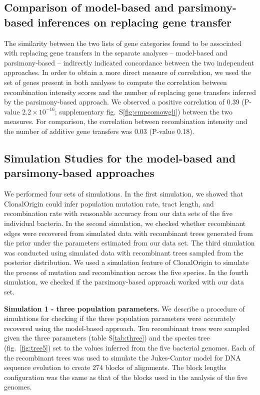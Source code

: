 \documentclass[12pt]{article}
\begin{document}
\subsection*{Comparison of model-based and parsimony-based inferences on
replacing gene transfer}

The similarity between the two lists of gene categories found to be associated
with replacing gene transfers in the separate analyses -- model-based and
parsimony-based --  indirectly indicated concordance between the two independent
approaches.  In order to obtain a more direct measure of correlation, we used
the set of genes present in both analyses to compute the correlation between
recombination intensity scores and the number of replacing gene transfers
inferred by the parsimony-based approach. We observed a positive correlation of
$0.39$ (P-value $2.2\times10^{-16}$; supplementary fig.\ S\ref{fig:cmpcomowgli})
between the
two measures.  For comparison, the correlation between recombination intensity
and the number of additive gene transfers was 0.03 (P-value 0.18).

\subsection*{Simulation Studies for the model-based and parsimony-based approaches}
We performed four sets of simulations.  In the first simulation, we 
showed that ClonalOrigin could infer population mutation rate, tract
length, and recombination rate with reasonable accuracy from our data sets of
the five individual bacteria. In the second
simulation, we checked whether recombinant edges were recovered from
simulated data with recombinant trees generated from the prior under the
parameters estimated from our data set. The third
simulation was conducted using simulated data with recombinant trees sampled
from the
posterior distribution.  We used a simulation feature of ClonalOrigin
to simulate the process of mutation and recombination across the five species.
In the fourth simulation, we checked if the parsimony-based approach worked with
our data set.

\textbf{Simulation 1 - three population parameters.}
We describe a procedure of simulations for checking if the three
population parameters were accurately recovered using the model-based approach.
Ten recombinant trees were sampled given the three parameters (table
S\ref{tab:three}) and the species tree (fig.\ \ref{fig:tree5}) set to the
values inferred from the five bacterial genomes.  Each of the recombinant trees
was used to simulate the Jukes-Cantor model for DNA sequence evolution to create
274 blocks of alignments.  The block lengths configuration was the same as that
of the blocks used in the analysis of the five genomes.  
\end{document}
